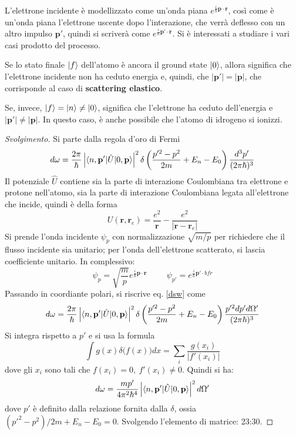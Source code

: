 \documentclass[11pt, a4paper]{scrartcl} %
\numberwithin{equation}{subsection}
\theoremstyle{style2}
\theoremstyle{style1}
\renewcommand\qedsymbol{$\blacksquare$}
\newenvironment{svolgimento}{\renewcommand\qedsymbol{$\spadesuit$}\begin{proof}[Svolgimento]}{\end{proof}}
\begin{document}
L'elettrone incidente \`e modellizzato come un'onda piana $e^{\frac{i}{\hbar }\mathbf{p} \cdot \mathbf{r} } $, cos\`i come \`e un'onda piana l'elettrone uscente dopo l'interazione, che verr\`a deflesso con un altro impulso $\mathbf{p} '$, quindi si scriver\`a come $e^{\frac{i}{\hbar }\mathbf{p} ' \cdot \mathbf{r } } $.
Si \`e interessati a studiare i vari casi prodotto del processo.

\vspace{.5cm} 
 Se lo stato finale $\ket{f} $ dell'atomo \`e ancora il ground state $\ket{0} $, allora significa che l'elettrone incidente non ha ceduto energia e, quindi, che $\lvert \mathbf{p} ' \rvert = \lvert  \mathbf{p}  \rvert $, che corrisponde al caso di \textbf{scattering elastico}.

Se, invece, $\ket{f}  = \ket{n} \neq \ket{0} $, significa che l'elettrone ha ceduto dell'energia e $\lvert \mathbf{p} ' \rvert \neq \lvert \mathbf{p}  \rvert $. 
In questo caso, \`e anche possibile che l'atomo di idrogeno si ionizzi.
\vspace{.5cm} 
\begin{svolgimento}
	Si parte dalla regola d'oro di Fermi
	\begin{equation}\label{dsw}
		d\omega = \frac{2\pi}{\hbar }\left\lvert \braket{n,\mathbf{p} '|\hat{U}|0,\mathbf{p} }  \right\rvert ^2 \delta \left(\frac{p'^2 - p^2}{2m} +E_n - E_0\right) \frac{d^3 p'}{(2\pi \hbar )^3}
	\end{equation}
	Il potenziale $\hat{U}$ contiene sia la parte di interazione Coulombiana tra elettrone e protone nell'atomo, sia la parte di interazione Coulombiana legata all'elettrone che incide, quindi \`e della forma
	\[
		U(\mathbf{r},\mathbf{r} _e) = \frac{e^2}{\mathbf{r} } - \frac{e^2}{\lvert \mathbf{r} -\mathbf{r} _e \rvert } 
	\] 
Si prende l'onda incidente $\psi _p$ con normalizzazione $\sqrt{m / p} $ per richiedere che il flusso incidente sia unitario; per l'onda dell'elettrone scatterato, si lascia coefficiente unitario. In complessivo:
\[
\psi _p = \sqrt{\frac{m}{p}} e^{\frac{i}{\hbar }\mathbf{p} \cdot \mathbf{r} } \hspace{1cm} \psi _{p'} = e^{\frac{i}{\hbar }\mathbf{p} ' \cdot bfr} 
\] 
Passando in coordiante polari, si riscrive eq. \ref{dsw} come
\[
 d\omega = \frac{2\pi}{\hbar }\left\lvert \braket{n,\mathbf{p} '|\hat{U}|0,\mathbf{p} }  \right\rvert ^2 \delta \left(\frac{p'^2 - p^2}{2m}+E_n - E_0\right) \frac{p'^2 dp' d\Omega' }{(2\pi \hbar )^3}
\] 
Si integra rispetto a $p'$ e si usa la formula 
\[
\int g(x) \delta \big(f(x)\big) dx = \sum_{i}^{} \frac{g(x_i)}{\lvert f'(x_i) \rvert }
\] 
dove gli $x_i $ sono tali che $f(x_i) =0 , \ f'(x_i) \neq 0$. 
Quindi si ha:
\[
	d\omega =  \frac{mp'}{4\pi^2 \hbar ^4} \left\lvert \braket{n,\mathbf{p'} |\hat{U}|0,\mathbf{p} }  \right\rvert ^2 d\Omega '
\] 
dove $p'$ \`e definito dalla relazione fornita dalla $\delta $, ossia $(p'^2 - p^2) / 2m + E_n - E_0 = 0$.
Svolgendo l'elemento di matrice:
23:30.
\end{svolgimento}
\end{document}
